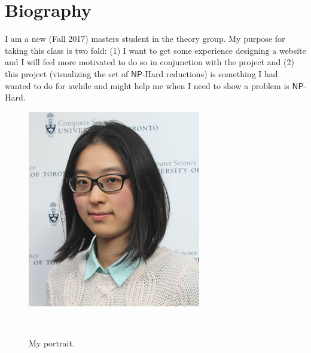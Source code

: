 \documentclass{sigchi}
\newcommand\ClassNP{\mathsf{NP}}
\begin{document}
\section{Biography}
I am a new (Fall 2017) masters student in the theory group. My purpose for taking this class is two fold: (1) I want to get some experience designing a website and I will feel more motivated to do so in conjunction with the project and (2) this project (visualizing the set of $\ClassNP$-Hard reductions) is something I had wanted to do for awhile and might help me when I need to show a problem is $\ClassNP$-Hard.

\begin{figure}
\centering
  \includegraphics[width=0.9\columnwidth]{figures/Theory5}
  \caption{My portrait.}~
  \label{fig:photograph}
\end{figure}



\end{document}
